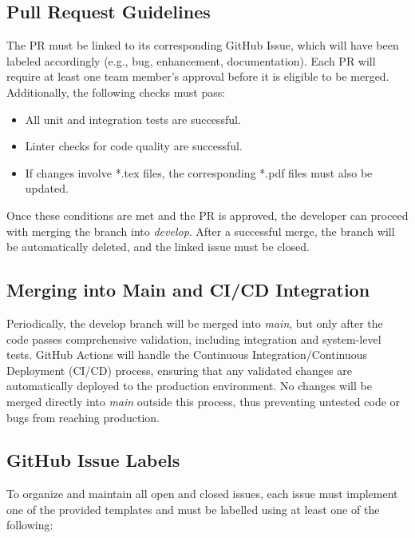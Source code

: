 \documentclass{article}
\begin{document}
\subsection*{Pull Request Guidelines}
The PR must be linked to its corresponding GitHub Issue, which will have been labeled accordingly (e.g., bug, enhancement, documentation). Each PR will require at least one team member's approval before it is eligible to be merged. Additionally, the following checks must pass:

\begin{itemize}
    \item All unit and integration tests are successful.
    \item Linter checks for code quality are successful.
    \item If changes involve *.tex files, the corresponding *.pdf files must also be updated.
\end{itemize}

Once these conditions are met and the PR is approved, the developer can proceed with merging the branch into \textit{develop}. After a successful merge, the branch will be automatically deleted, and the linked issue must be closed.

\subsection*{Merging into Main and CI/CD Integration}
Periodically, the develop branch will be merged into \textit{main}, but only after the code passes comprehensive validation, including integration and system-level tests. GitHub Actions will handle the Continuous Integration/Continuous Deployment (CI/CD) process, ensuring that any validated changes are automatically deployed to the production environment. No changes will be merged directly into \textit{main} outside this process, thus preventing untested code or bugs from reaching production.

\subsection*{GitHub Issue Labels}

To organize and maintain all open and closed issues, each issue must implement one of the provided templates and must be labelled using at least one of the following:
\end{document}

